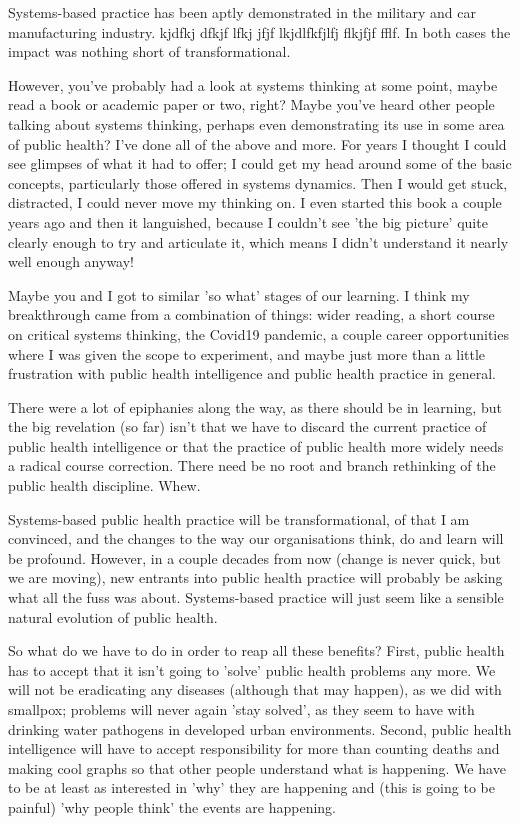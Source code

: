 Systems-based practice has been aptly demonstrated in the military and car manufacturing industry. kjdfkj dfkjf lfkj jfjf lkjdlfkfjlfj flkjfjf fflf. In both cases the impact was nothing short of transformational.

However, you've probably had a look at systems thinking at some point, maybe read a book or academic paper or two, right? Maybe you've heard other people talking about systems thinking, perhaps even demonstrating its use in some area of public health? I've done all of the above and more. For years I thought I could see glimpses of what it had to offer; I could get my head around some of the basic concepts, particularly those offered in systems dynamics. Then I would get stuck, distracted, I could never move my thinking on. I even started this book a couple years ago and then it languished, because I couldn't see 'the big picture' quite clearly enough to try and articulate it, which means I didn't understand it nearly well enough anyway!

Maybe you and I got to similar 'so what' stages of our learning. I think my breakthrough came from a combination of things: wider reading, a short course on critical systems thinking, the Covid19 pandemic, a couple career opportunities where I was given the scope to experiment, and maybe just more than a little frustration with public health intelligence and public health practice in general.

There were a lot of epiphanies along the way, as there should be in learning, but the big revelation (so far) isn't that we have to discard the current practice of public health intelligence or that the practice of public health more widely needs a radical course correction. There need be no root and branch rethinking of the public health discipline. Whew.

Systems-based public health practice will be transformational, of that I am convinced, and the changes to the way our organisations think, do and learn will be profound. However, in a couple decades from now (change is never quick, but we are moving), new entrants into public health practice will probably be asking what all the fuss was about. Systems-based practice will just seem like a sensible natural evolution of public health.

So what do we have to do in order to reap all these benefits? First, public health has to accept that it isn't going to 'solve' public health problems any more. We will not be eradicating any diseases (although that may happen), as we did with smallpox; problems will never again 'stay solved', as they seem to have with drinking water pathogens in developed urban environments. Second, public health intelligence will have to accept responsibility for more than counting deaths and making cool graphs so that other people understand what is happening. We have to be at least as interested in 'why' they are happening and (this is going to be painful) 'why people think' the events are happening.

